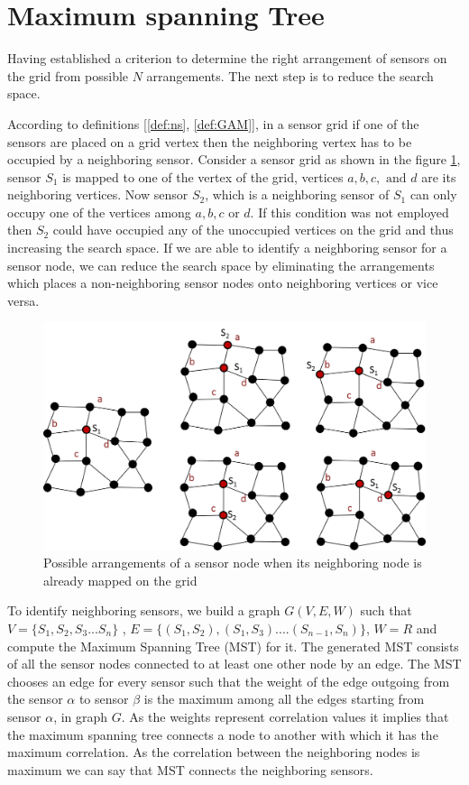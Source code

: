 \section{Maximum spanning Tree}

Having established a criterion to determine the right arrangement of sensors on the grid from  possible ${N}$ arrangements. The next step is to reduce the search space.

According to definitions [\ref{def:ns}, \ref{def:GAM}], in a sensor grid if one of the sensors are placed on a grid vertex then the neighboring vertex has to be occupied by a neighboring sensor. Consider a sensor grid as shown in the figure \ref{fig:prune}, sensor $S_1$ is mapped to one of the vertex of the grid, vertices $a,b,c,\text{ and }d$ are its neighboring vertices. Now sensor $S_2$, which is a neighboring sensor of $S_1$ can only occupy one of the vertices among $a,b,c\text{ or }d$. If this condition was not employed then $S_2$ could have occupied any of the unoccupied vertices on the grid and thus increasing the search space. If we are able to identify a neighboring sensor for a sensor node, we can reduce the search space by eliminating the arrangements which places a non-neighboring sensor nodes onto neighboring vertices or vice versa.
\begin{figure}[!ht]
\includegraphics[scale=0.5]{./pics/prune}
\centering
\caption{Possible arrangements of a sensor node when its neighboring node is already mapped on the grid}
\label{fig:prune}
\end{figure}



To identify neighboring sensors, we build a graph $G(V,E,W)$ such that $V = \{S_1,S_2,S_3...S_n\}$ , $ E= \{(S_1,S_2),(S_1,S_3)....(S_{n-1},S_n)\}$, $W = R$ and compute the Maximum Spanning Tree (MST) for it. The generated MST consists of all the sensor nodes connected to at least one other node by an edge. The MST chooses an edge for every sensor such that the weight of the edge outgoing from the sensor $\alpha$ to sensor $\beta$ is the maximum among all the edges starting from sensor $\alpha$, in graph ${G}$. As the weights represent correlation values it implies that the maximum spanning tree connects a node to another with which it has the maximum correlation. As the correlation between the neighboring nodes is maximum we can say that MST connects the neighboring sensors.

